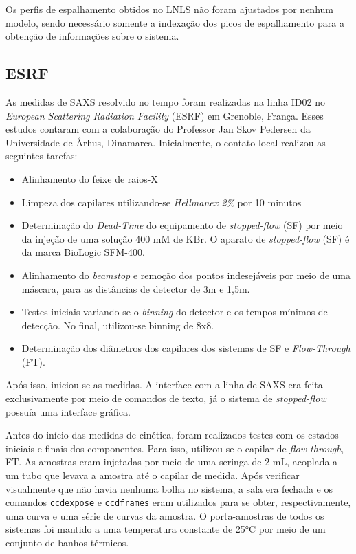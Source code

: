 			Os perfis de espalhamento obtidos no LNLS não foram ajustados por nenhum modelo, sendo necessário somente a indexação dos picos de espalhamento para a obtenção de informações sobre o sistema.		
			
			\subsection{ESRF}
			As medidas de SAXS resolvido no tempo foram realizadas na linha ID02 no \emph{European Scattering Radiation Facility} (ESRF) em Grenoble, França. Esses estudos contaram com a colaboração do Professor Jan Skov Pedersen da Universidade de \AA rhus, Dinamarca. Inicialmente, o contato local realizou as seguintes tarefas:
			
			\begin{itemize}
				\item Alinhamento do feixe de raios-X
				\item Limpeza dos capilares utilizando-se \emph{Hellmanex 2\%} por 10 minutos
				\item Determinação do \emph{Dead-Time} do equipamento de \emph{stopped-flow} (SF) por meio da injeção de uma solução 400 mM de KBr. O aparato de \emph{stopped-flow} (SF) é da marca BioLogic SFM-400.
				\item Alinhamento do \emph{beamstop} e remoção dos pontos indesejáveis por meio de uma máscara, para as distâncias de detector de 3m e 1,5m.
				\item Testes iniciais variando-se o \emph{binning} do detector e os tempos mínimos de detecção. No final, utilizou-se binning de 8x8.
				\item Determinação dos diâmetros dos capilares dos sistemas de SF e \emph{Flow-Through} (FT).
			\end{itemize}
			
			Após isso, iniciou-se as medidas. A interface com a linha de SAXS era feita exclusivamente por meio de comandos de texto, já o sistema de \emph{stopped-flow} possuía uma interface gráfica.
			
			Antes do início das medidas de cinética, foram realizados testes com os estados iniciais e finais dos componentes. Para isso, utilizou-se o capilar de \emph{flow-through}, FT. As amostras eram injetadas por meio de uma seringa de 2 mL, acoplada a um tubo que levava a amostra até o capilar de medida. Após verificar visualmente que não havia nenhuma bolha no sistema, a sala era fechada e os comandos \texttt{ccdexpose} e \texttt{ccdframes} eram utilizados para se obter, respectivamente, uma curva e uma série de curvas da amostra. O porta-amostras de todos os sistemas foi mantido a uma temperatura constante de 25°C por meio de um conjunto de banhos térmicos.
			

